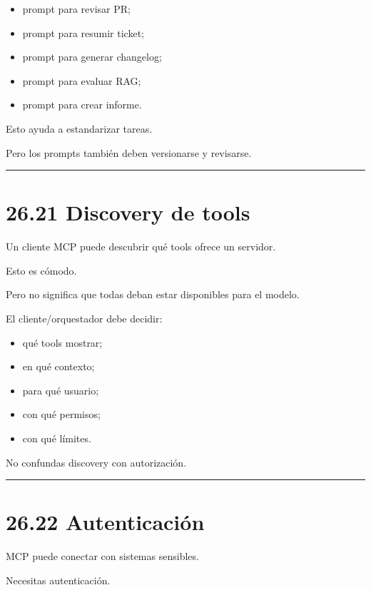 \begin{itemize}
\tightlist
\item
  prompt para revisar PR;
\item
  prompt para resumir ticket;
\item
  prompt para generar changelog;
\item
  prompt para evaluar RAG;
\item
  prompt para crear informe.
\end{itemize}

Esto ayuda a estandarizar tareas.

Pero los prompts también deben versionarse y revisarse.

\begin{center}\rule{0.5\linewidth}{0.5pt}\end{center}

\section{26.21 Discovery de tools}\label{discovery-de-tools}

Un cliente MCP puede descubrir qué tools ofrece un servidor.

Esto es cómodo.

Pero no significa que todas deban estar disponibles para el modelo.

El cliente/orquestador debe decidir:

\begin{itemize}
\tightlist
\item
  qué tools mostrar;
\item
  en qué contexto;
\item
  para qué usuario;
\item
  con qué permisos;
\item
  con qué límites.
\end{itemize}

No confundas discovery con autorización.

\begin{center}\rule{0.5\linewidth}{0.5pt}\end{center}

\section{26.22 Autenticación}\label{autenticaciuxf3n}

MCP puede conectar con sistemas sensibles.

Necesitas autenticación.

